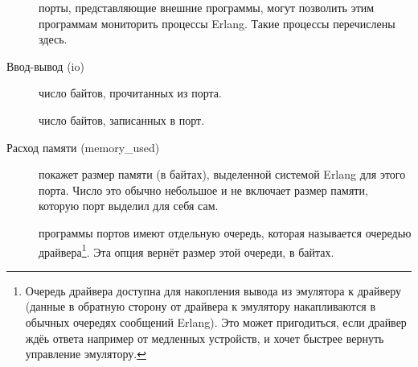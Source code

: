 \documentclass[11pt, oneside]{book}   	%
\begin{document}
\begin{description*}
\begin{description}
	\item[] порты, представляющие внешние программы, могут позволить этим программам мониторить процессы Erlang. Такие процессы перечислены здесь.
\end{description}
	
\item[Ввод-вывод (io)] \hfill
\begin{description}		
	\item[] число байтов, прочитанных из порта.
	
	\item[] число байтов, записанных в порт.
\end{description}

\item[Расход памяти (memory\_used)] \hfill
\begin{description}		
	\item[] покажет размер памяти (в байтах), выделенной системой Erlang для этого порта. Число это обычно небольшое и не включает размер памяти, которую порт выделил для себя сам.
	
	\item[] программы портов имеют отдельную очередь, которая называется очередью драйвера\footnote{Очередь драйвера доступна для накопления вывода из эмулятора к драйверу (данные в обратную сторону от драйвера к эмулятору накапливаются в обычных очередях сообщений Erlang). Это может пригодиться, если драйвер ждёь ответа например от медленных устройств, и хочет быстрее вернуть управление эмулятору.}. Эта опция вернёт размер этой очереди, в байтах.
\end{description}
	

\end{description*}
\end{document}
